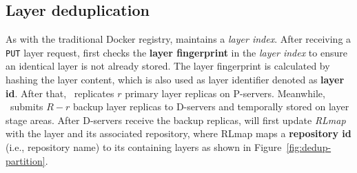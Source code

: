 \subsection{Layer deduplication}
\label{sec:dedup-desgin}

%
%

As with the traditional Docker registry, 
\sysname maintains a \emph{layer index}.
After receiving a \texttt{PUT} layer request,
\sysname first checks the \textbf{layer fingerprint} in the \emph{layer index} to ensure 
an identical layer is not already stored.
The layer fingerprint is calculated by hashing the layer content, which is also used as layer identifier denoted as \textbf{layer id}.
After that, \sysname~replicates $r$ primary layer replicas on P-servers. 
Meanwhile, \sysname~submits $R-r$ backup layer replicas to D-servers and temporally stored on layer stage areas.
 After D-servers receive the backup replicas,
 \sysname will first update \emph{RLmap} with the layer and its associated repository, where
RLmap maps a \textbf{repository id} (i.e., repository name) to its containing layers 
as shown in Figure~\ref{fig:dedup-partition}.

 
